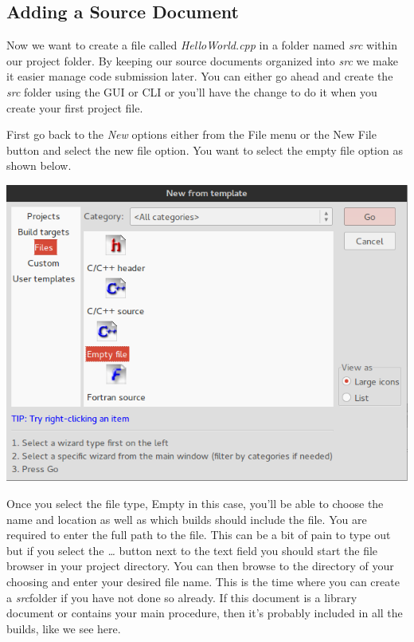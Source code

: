 \documentclass[10pt]{article}
\begin{document}
\subsection{Adding a Source Document}

Now we want to create a file called \textit{HelloWorld.cpp} in a folder named \textit{src} within our project folder. By keeping our source documents organized into \textit{src} we make it easier manage code submission later. You can either go ahead and create the \textit{src} folder using the GUI or CLI or you'll have the change to do it when you create your first project file.

First go back to the \textit{New} options either from the File menu or the New File button and select the new file option. You want to select the empty file option as shown below.

\vspace{.1in}
\begin{center}
\includegraphics[scale=.5]{CB_NewFileEmptyCPP.png}
\end{center}
\vspace{.1in}

Once you select the file type, Empty in this case, you'll be able to choose the name and location as well as which builds should include the file. You are required to enter the full path to the file. This can be a bit of pain to type out but if you select the \textit{\ldots} button next to the text field you should start the file browser in your project directory. You can then browse to the directory of your choosing and enter your desired file name. This is the time where you can create a \textit{src}folder if you have not done so already. If this document is a library document or contains your main procedure, then it's probably included in all the builds, like we see here.
\end{document}
